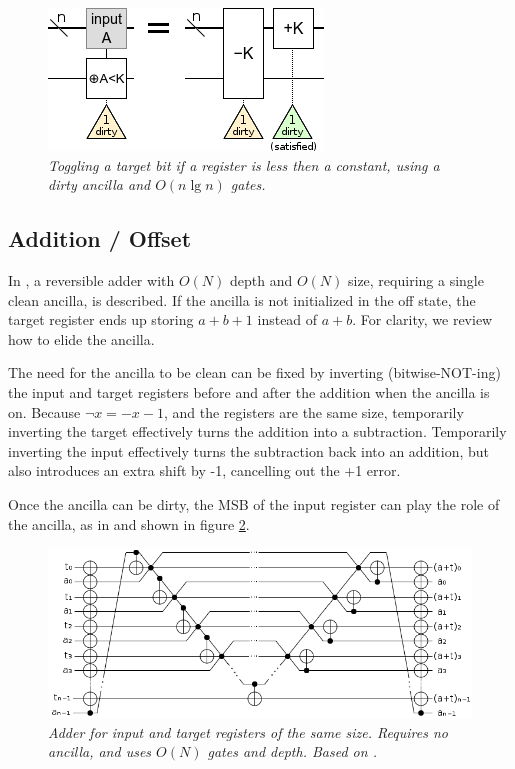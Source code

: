 \documentclass[twocolumn]{article}
\begin{document}
\begin{figure}
  \centering
  \includegraphics[width=\linewidth]{assets/comparison-less-const.png}
  \caption{\em Toggling a target bit if a register is less then a constant, using a dirty ancilla and $O(n \lg n)$ gates.}
  \label{fig:comparison-less-const}
\end{figure}


\subsection{Addition / Offset}

In \cite{van2004}, a reversible adder with $O(N)$ depth and $O(N)$ size, requiring a single clean ancilla, is described.
If the ancilla is not initialized in the off state, the target register ends up storing $a+b+1$ instead of $a+b$.
For clarity, we review how to elide the ancilla.

The need for the ancilla to be clean can be fixed by inverting (bitwise-NOT-ing) the input and target registers before and after the addition when the ancilla is on.
Because $\lnot x = -x-1$, and the registers are the same size, temporarily inverting the target effectively turns the addition into a subtraction.
Temporarily inverting the input effectively turns the subtraction back into an addition, but also introduces an extra shift by -1, cancelling out the +1 error.

Once the ancilla can be dirty, the MSB of the input register can play the role of the ancilla, as in \cite{takahashi2005} and shown in figure \ref{fig:inlineadder}.

\begin{figure}
  \centering
  \includegraphics[width=\linewidth]{assets/inline-adder.png}
  \caption{\em Adder for input and target registers of the same size.
  Requires no ancilla, and uses $O(N)$ gates and depth.
  Based on \cite{van2004, takahashi2005}.}
  \label{fig:inlineadder}
\end{figure}
\end{document}
